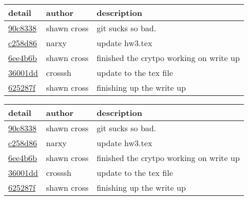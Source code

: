 \begin{tabular}{l l l}\textbf{detail} & \textbf{author} & \textbf{description}\\\hline
\href{https://github.com/crosssh/cs444/commit/90c833816bad716ceedd20fe1b47ce2d5822b3e0}{90c8338} & shawn cross & git sucks so bad.\\\hline
\href{https://github.com/crosssh/cs444/commit/c258d8693943c8d485286b946f36b00db533652c}{c258d86} & narxy & update hw3.tex\\\hline
\href{https://github.com/crosssh/cs444/commit/6ee4b6b1f3698e604beb00abe07b3988e9ab4f29}{6ee4b6b} & shawn cross & finished the crytpo working on write up\\\hline
\href{https://github.com/crosssh/cs444/commit/36001ddeb5eecb218672829156a124c4a0971a8e}{36001dd} & crosssh & update to the tex file\\\hline
\href{https://github.com/crosssh/cs444/commit/625287fc9915eb508139598719b3c66a33ecc80e}{625287f} & shawn cross & finishing up the write up\\\hline\end{tabular}


\begin{tabular}{l l l}\textbf{detail} & \textbf{author} & \textbf{description}\\\hline
\href{https://github.com/crosssh/cs444/commit/90c833816bad716ceedd20fe1b47ce2d5822b3e0}{90c8338} & shawn cross & git sucks so bad.\\\hline
\href{https://github.com/crosssh/cs444/commit/c258d8693943c8d485286b946f36b00db533652c}{c258d86} & narxy & update hw3.tex\\\hline
\href{https://github.com/crosssh/cs444/commit/6ee4b6b1f3698e604beb00abe07b3988e9ab4f29}{6ee4b6b} & shawn cross & finished the crytpo working on write up\\\hline
\href{https://github.com/crosssh/cs444/commit/36001ddeb5eecb218672829156a124c4a0971a8e}{36001dd} & crosssh & update to the tex file\\\hline
\href{https://github.com/crosssh/cs444/commit/625287fc9915eb508139598719b3c66a33ecc80e}{625287f} & shawn cross & finishing up the write up\\\hline\end{tabular}


